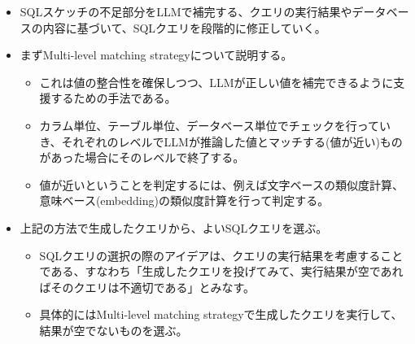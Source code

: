 \documentclass[dvipdfmx,uplatex]{jsarticle}
\theoremstyle{remark}
\newenvironment{method}[1]{
    \begin{tcolorbox}[
        colframe=green!50!black,
        colback=green!50!black!10!white,
        colbacktitle=green!50!black!40!white,
        coltitle=black,
        fonttitle=\bfseries,
        title={#1}
    ]
}{
    \end{tcolorbox}
}
\begin{document}
\begin{method}{SQLクエリの補完と修正}
\begin{itemize}
    \item SQLスケッチの不足部分をLLMで補完する、クエリの実行結果やデータベースの内容に基づいて、SQLクエリを段階的に修正していく。
    \item まずMulti-level matching strategyについて説明する。
    \begin{itemize}
        \item これは値の整合性を確保しつつ、LLMが正しい値を補完できるように支援するための手法である。
        \item カラム単位、テーブル単位、データベース単位でチェックを行っていき、それぞれのレベルでLLMが推論した値とマッチする(値が近い)ものがあった場合にそのレベルで終了する。
        \item 値が近いということを判定するには、例えば文字ベースの類似度計算、意味ベース(embedding)の類似度計算を行って判定する。
    \end{itemize}
    \item 上記の方法で生成したクエリから、よいSQLクエリを選ぶ。
    \begin{itemize}
        \item SQLクエリの選択の際のアイデアは、クエリの実行結果を考慮することである、すなわち「生成したクエリを投げてみて、実行結果が空であればそのクエリは不適切である」とみなす。
        \item 具体的にはMulti-level matching strategyで生成したクエリを実行して、結果が空でないものを選ぶ。 
    \end{itemize}
\end{itemize}
\end{method}
\end{document}
